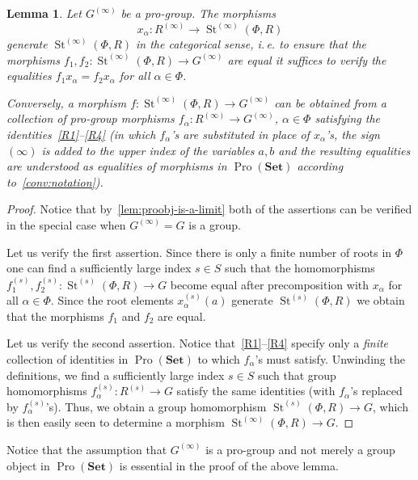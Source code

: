 \documentclass{article}
\newtheorem{lemma}{Lemma} \numberwithin{lemma}{section}
\theoremstyle{definition}
\theoremstyle{remark}
\DeclareMathOperator\St{St}
\DeclareMathOperator{\Pro}{Pro}
\newcommand{\Set}{\mathbf{Set}}
\begin{document}
\begin{lemma}\label{SteinbergPresentation}
Let \(G^{(\infty)}\) be a pro-group. The morphisms \[x_{\alpha} \colon R^{(\infty)} \to \St^{(\infty)}(\Phi, R)\] generate $\St^{(\infty)}(\Phi, R)$ in the categorical sense, i.\,e. to ensure that the morphisms $f_1,f_2\colon\St^{(\infty)}(\Phi, R) \to G^{(\infty)}$ are equal it suffices to verify the equalities $f_1 x_{\alpha} = f_2 x_\alpha$ for all $\alpha\in\Phi$.

Conversely, a morphism $f \colon \St^{(\infty)}(\Phi, R) \to G^{(\infty)}$ can be obtained from a collection of pro-group morphisms \(f_{\alpha} \colon R^{(\infty)} \to G^{(\infty)}\), $\alpha \in \Phi$ satisfying the identities~\eqref{R1}--\eqref{R4} (in which $f_{\alpha}$'s are substituted in place of $x_\alpha$'s, the sign $(\infty)$ is added to the upper index of the variables $a, b$ and the resulting equalities are understood as equalities of morphisms in \(\Pro(\Set)\) according to~\cref{conv:notation}).
\end{lemma}
\begin{proof}
Notice that by~\cref{lem:proobj-is-a-limit} both of the assertions can be verified in the special case when $G^{(\infty)} = G$ is a group.

Let us verify the first assertion. Since there is only a finite number of roots in $\Phi$ one can find a sufficiently large index $s \in S$ such that the homomorphisms $f_1^{(s)}, f_2^{(s)}\colon \St^{(s)}(\Phi, R) \to G$ become equal after precomposition with $x_\alpha$ for all $\alpha \in \Phi$.
Since the root elements $x_\alpha^{(s)}(a)$ generate $\St^{(s)}(\Phi, R)$ we obtain that the morphisms $f_1$ and $f_2$ are equal.

Let us verify the second assertion. 
Notice that~\eqref{R1}--\eqref{R4} specify only a {\it finite} collection of identities in $\Pro(\Set)$ to which $f_\alpha$'s must satisfy.
Unwinding the definitions, we find a sufficiently large index $s \in S$ such that group homomorphisms 
 $f_\alpha^{(s)}\colon R^{(s)} \to G$ satisfy the same identities (with $f_\alpha$'s replaced by $f_\alpha^{(s)}$'s).
Thus, we obtain a group homomorphism $\St^{(s)}(\Phi, R) \to G$, which is then easily seen to determine a morphism $\St^{(\infty)}(\Phi, R) \to G$.
\end{proof}
Notice that the assumption that $G^{(\infty)}$ is a pro-group and not merely a group object in $\Pro(\Set)$ is essential in the proof of the above lemma.


\printbibliography
\end{document}
